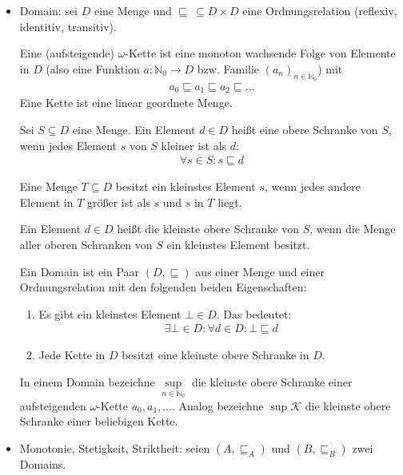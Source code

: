 \documentclass[
  a4paper,
  11pt,
]{scrartcl}
\newcommand{\N}{\mathbb{N}}
\newcommand{\Kc}{\mathcal{K}}
\begin{document}
\begin{itemize}
  \item Domain: sei $D$ eine Menge und $\sqsubseteq \ \subseteq D \times D$ eine
    Ordnungsrelation (reflexiv, identitiv, transitiv).

    Eine (aufsteigende) $\omega$-Kette ist eine monoton wachsende Folge von
    Elemente in $D$ (also eine Funktion $a: \N_0 \rightarrow D$ bzw. Familie
    ${(a_n)}_{n \in \N_0}$) mit
    \begin{align*}
      a_0 \sqsubseteq a_1 \sqsubseteq a_2 \sqsubseteq \dots
    \end{align*}
    Eine Kette ist eine linear geordnete Menge.

    Sei $S \subseteq D$ eine Menge. Ein Element $d \in D$ heißt eine obere
    Schranke von $S$, wenn jedes Element $s$ von $S$ kleiner ist als $d$:
    \begin{align*}
      \forall s \in S: s \sqsubseteq d
    \end{align*}

    Eine Menge $T \subseteq D$ besitzt ein kleinstes Element $s$, wenn jedes
    andere Element in $T$ größer ist als $s$ und $s$ in $T$ liegt.

    Ein Element $d \in D$ heißt die kleinste obere Schranke von $S$, wenn die
    Menge aller oberen Schranken von $S$ ein kleinstes Element besitzt.

    Ein Domain ist ein Paar $(D, \sqsubseteq)$ aus einer Menge und einer
    Ordnungsrelation mit den folgenden beiden Eigenschaften:
    \begin{enumerate}
      \item Es gibt ein kleinstes Element $\bot \in D$. Das bedeutet:
        \begin{align*}
          \exists \bot \in D:
            \forall d \in D:
              \bot \sqsubseteq d
        \end{align*}

      \item Jede Kette in $D$ besitzt eine kleinste obere Schranke in $D$.
    \end{enumerate}

    In einem Domain bezeichne $\sup\limits_{n \in \N_0}$ die kleinste obere
    Schranke einer aufsteigenden $\omega$-Kette $a_0, a_1, \dots$. Analog
    bezeichne $\sup \Kc$ die kleinste obere Schranke einer beliebigen Kette.

  \item Monotonie, Stetigkeit, Striktheit: seien $(A, \sqsubseteq_A)$ und $(B,
    \sqsubseteq_B)$ zwei Domains.


\end{itemize}
\end{document}
